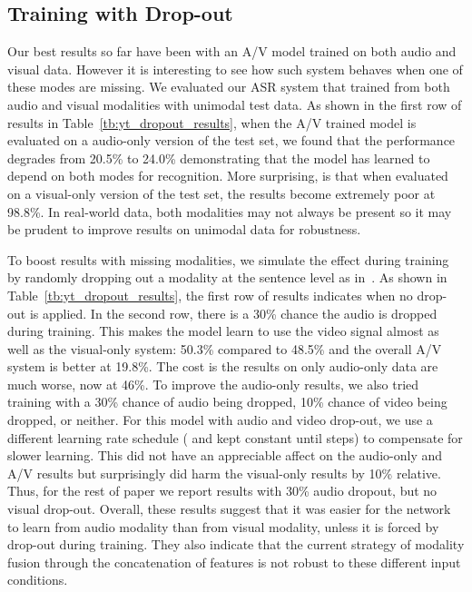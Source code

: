\documentclass{article}
\newcommand{\negsectionspace}{\vspace{-4pt}}
\begin{document}
\negsectionspace
\subsection{Training with Drop-out}
\label{sec:dropout}
\negsectionspace
Our best results so far have been with an A/V model trained on both
audio and visual data. However it is interesting to see how such
system behaves when one of these modes are missing.  We evaluated our
ASR system that trained from both audio and visual modalities with
unimodal test data. As shown in the first row of results in
Table~\ref{tb:yt_dropout_results}, when the A/V trained model is
evaluated on a audio-only version of the test set, we found that the
performance degrades from 20.5\% to 24.0\% demonstrating that the
model has learned to depend on both modes for recognition. More
surprising, is that when evaluated on a visual-only version of the
test set, the results become extremely poor at 98.8\%. In real-world
data, both modalities may not always be present so it may be prudent
to improve results on unimodal data for robustness.

To boost results with missing modalities, we simulate the effect
during training by randomly dropping out a modality at the sentence
level as in~\cite{zhang19avdropout}. As shown in Table~\ref{tb:yt_dropout_results}, the first row of
results indicates when no drop-out is applied. In the second row,
there is a 30\% chance the audio is dropped during training. This
makes the model learn to use the video signal almost as well as the
visual-only system: 50.3\% compared to 48.5\% and the overall A/V
system is better at 19.8\%. The cost is the results on only audio-only
data are much worse, now at 46\%. To improve the audio-only results,
we also tried training with a 30\% chance of audio being dropped, 10\%
chance of video being dropped, or neither. For this model with audio
and video drop-out, we use a different learning rate schedule
( and kept constant until  steps) to compensate
for slower learning. This did not have an appreciable affect on the
audio-only and A/V results but surprisingly did harm the visual-only
results by 10\% relative. Thus, for the rest of paper we report
results with 30\% audio dropout, but no visual drop-out. Overall,
these results suggest that it was easier for the network to learn from
audio modality than from visual modality, unless it is forced by
drop-out during training. They also indicate that the current strategy
of modality fusion through the concatenation of features is not robust
to these different input conditions.
\end{document}
